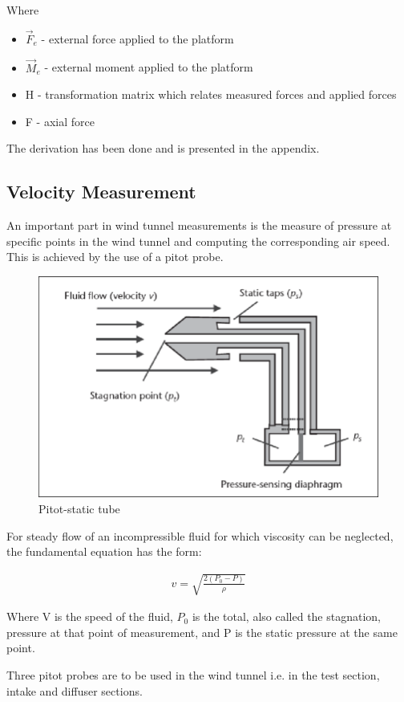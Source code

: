 Where 
\begin{itemize}
\item $\vec{F}_e $ - external force applied to the platform
\item $\vec{M}_e$ - external moment applied to the platform
\item H - transformation matrix which relates measured forces and applied forces
\item F - axial force
\end{itemize}  
The derivation has been done and is presented in the appendix.

\subsection{Velocity Measurement}
An important part in wind tunnel measurements is the measure of pressure at specific points in the wind tunnel and computing the corresponding air speed. This is achieved by the use of a pitot probe. 
\begin{center}
\begin{figure}[H]
\centering
\includegraphics[width=0.6\linewidth]{Figures/pitot}
\caption[Pitot-static tube]{Pitot-static tube \cite{viquerat_continuous_2006}}
\end{figure}
\end{center}
For steady flow of an incompressible fluid for which viscosity can be neglected, the fundamental equation has the form\cite{viquerat_continuous_2006}:

\begin{ceqn}
	\begin{align}
	v = \sqrt{\frac{2(P_{0} - P)}{\rho}}
\end{align}
\end{ceqn}

Where V is the speed of the fluid, $P_{0}$ is the total, also called the stagnation, pressure at that point of measurement, and P is the static pressure at the same point.

Three pitot probes are to be used in the wind tunnel i.e. in the test section, intake and diffuser sections.
                                                                                                                                                                   
